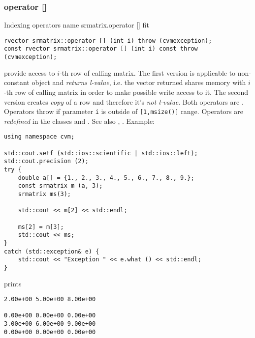\subsubsection{operator []}
Indexing operators%
\pdfdest name {srmatrix.operator []} fit
\begin{verbatim}
rvector srmatrix::operator [] (int i) throw (cvmexception);
const rvector srmatrix::operator [] (int i) const throw (cvmexception);
\end{verbatim}
provide access to \hbox{$i$-th} row of calling matrix. The first version
is applicable to non-constant object and
\emph{returns  l-value}, i.e. the vector returned shares  memory
with \hbox{$i$-th} row of calling matrix
in order to make possible write access to it.
The second version creates  \emph{copy} of a row and therefore it's
\emph{not  l-value}.
Both operators are \Based.
Operators throw 
if  parameter \verb"i" is outside of \verb"[1,msize()]" range.
Operators are \emph{redefined}
in the classes 
and .
See also ,
.
Example:
\begin{Verbatim}
using namespace cvm;

std::cout.setf (std::ios::scientific | std::ios::left); 
std::cout.precision (2);
try {
    double a[] = {1., 2., 3., 4., 5., 6., 7., 8., 9.};
    const srmatrix m (a, 3);
    srmatrix ms(3);

    std::cout << m[2] << std::endl;

    ms[2] = m[3];
    std::cout << ms;
}
catch (std::exception& e) {
    std::cout << "Exception " << e.what () << std::endl;
}
\end{Verbatim}
prints
\begin{Verbatim}
2.00e+00 5.00e+00 8.00e+00

0.00e+00 0.00e+00 0.00e+00
3.00e+00 6.00e+00 9.00e+00
0.00e+00 0.00e+00 0.00e+00
\end{Verbatim}
\newpage



